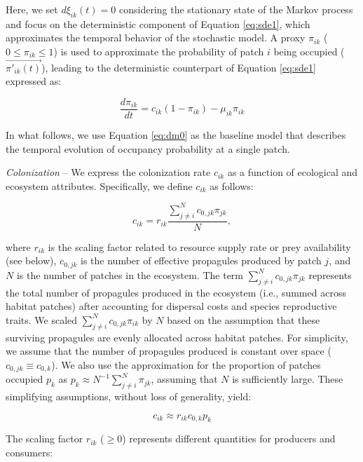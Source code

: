 \documentclass[11pt, class=article, crop=false]{standalone}
\begin{document}
Here, we set $d\xi_{ik}(t) = 0$ considering the stationary state of the Markov process and focus on the deterministic component of Equation \ref{eq:sde1}, which approximates the temporal behavior of the stochastic model.
A proxy $\pi_{ik}$ ($0 \le \pi_{ik} \le 1$) is used to approximate the probability of patch $i$ being occupied ($\overrightarrow{\pi'_{ik}(t)}$), leading to the deterministic counterpart of Equation \ref{eq:sde1} expressed as:

\begin{equation}
    \frac{d \pi_{ik}}{d t} = c_{ik} (1 - \pi_{ik}) - \mu_{ik} \pi_{ik}
    \label{eq:dm0}
\end{equation}

In what follows, we use Equation \ref{eq:dm0} as the baseline model that describes the temporal evolution of occupancy probability at a single patch.

\textit{Colonization} --
We express the colonization rate $c_{ik}$ as a function of ecological and ecosystem attributes.
Specifically, we define $c_{ik}$ as follows:

\begin{equation}
    c_{ik} = r_{ik} \frac{\sum_{j \ne i}^N c_{0, jk} \pi_{jk}}{N},
    \label{eq:clnz}
\end{equation}

where $r_{ik}$ is the scaling factor related to resource supply rate or prey availability (see below), $c_{0, jk}$ is the number of effective propagules produced by patch $j$, and $N$ is the number of patches in the ecosystem.
The term $\sum_{j \ne i}^N c_{0, jk} \pi_{jk}$ represents the total number of propagules produced in the ecosystem (i.e., summed across habitat patches) after accounting for dispersal costs and species reproductive traits.
We scaled $\sum_{j \ne i}^N c_{0, jk} \pi_{ik}$ by $N$ based on the assumption that these surviving propagules are evenly allocated across habitat patches.
For simplicity, we assume that the number of propagules produced is constant over space ($c_{0, jk} \equiv c_{0, k}$).
We also use the approximation for the proportion of patches occupied $p_k$ as $p_k \approx N^{-1}\sum_{j \ne i}^N \pi_{jk}$, assuming that $N$ is sufficiently large.
These simplifying assumptions, without loss of generality, yield:

\begin{equation}
     c_{ik} \approx r_{ik} c_{0, k} p_k
\end{equation}

The scaling factor $r_{ik}$ ($\ge 0$) represents different quantities for producers and consumers:
\end{document}

